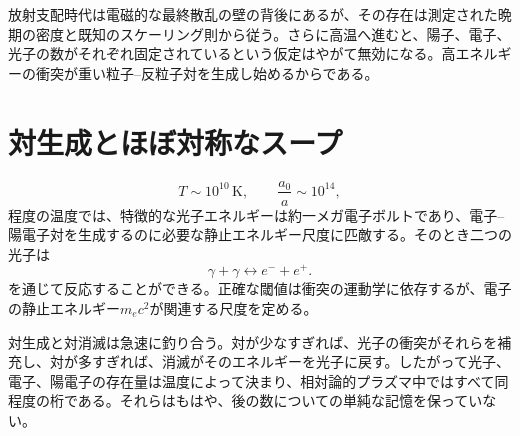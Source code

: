 放射支配時代は電磁的な最終散乱の壁の背後にあるが、その存在は測定された晩期の密度と既知のスケーリング則から従う。さらに高温へ進むと、陽子、電子、光子の数がそれぞれ固定されているという仮定はやがて無効になる。高エネルギーの衝突が重い粒子--反粒子対を生成し始めるからである。

\begin{classroomqa}
\end{classroomqa}

\section{対生成とほぼ対称なスープ}

\begin{equation}
T\sim10^{10}\,\mathrm{K},
\qquad
\frac{a_0}{a}\sim10^{14},
\end{equation} 程度の温度では、特徴的な光子エネルギーは約一メガ電子ボルトであり、電子--陽電子対を生成するのに必要な静止エネルギー尺度に匹敵する。そのとき二つの光子は
\begin{equation}
\gamma+\gamma
\longleftrightarrow
e^-+e^+.
\label{eq:c07-pair-reaction}
\end{equation}
を通じて反応することができる。正確な閾値は衝突の運動学に依存するが、電子の静止エネルギー\(m_ec^2\)が関連する尺度を定める。

対生成と対消滅は急速に釣り合う。対が少なすぎれば、光子の衝突がそれらを補充し、対が多すぎれば、消滅がそのエネルギーを光子に戻す。したがって光子、電子、陽電子の存在量は温度によって決まり、相対論的プラズマ中ではすべて同程度の桁である。それらはもはや、後の数についての単純な記憶を保っていない。

\begin{classroomqa}
\end{classroomqa}


